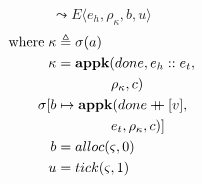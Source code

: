 \documentclass[12pt,draft]{article}
\newcommand\mdoubleplus{\ensuremath{\mathbin{+\mkern-9mu+}}}
\begin{document}
\begin{multicols*}{2}
\[\leadsto
E\langle
e_h , \rho_{\kappa} , b , u
\rangle
\]
\vspace{-10mm}
\begin{align*}
\text{where}\; \kappa &\triangleq \sigma(a) \\
\kappa &= \textbf{appk}(done, e_h::e_t, \\
&\;\;\;\;\;\;\;\;\;\;\;\;\;\; \rho_{\kappa}, c) \\
\sigma[b &\mapsto \textbf{appk}(done \mdoubleplus [v], \\
&\;\;\;\;\;\;\;\;\;\;\;\;\;\; e_t , \rho_{\kappa} , c)] \\
b &= alloc(\varsigma, 0) \\
u &= tick(\varsigma, 1)
\end{align*}

\vfill\null
\columnbreak



\end{multicols*}
\end{document}
